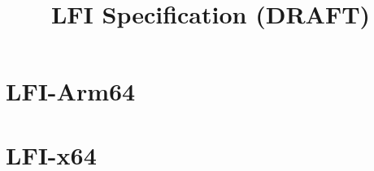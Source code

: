 \documentclass[11pt]{report}
\title{LFI Specification (DRAFT)}
\begin{document}
\maketitle

\tableofcontents

% 

\part{LFI-Arm64}


% 

\part{LFI-x64}


% 
% 
\end{document}
